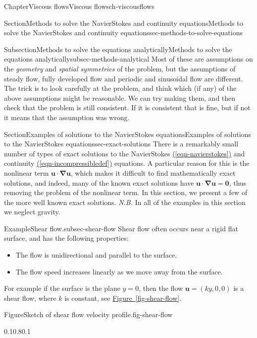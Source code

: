 \documentclass[oneside,10pt,]{book}
\newcommand{\xreffont}{\relax}
\newcommand{\ptxlistdisc}{\raisebox{0.3ex}{\textbullet}}
\numberwithin{equation}{section}
\newcommand{\bu}{\boldsymbol{u}}
\newcommand{\bzero}{\boldsymbol{0}}
\newcommand{\bnabla}{\boldsymbol{\nabla}}
\begin{document}
\begin{chapterptx}{Chapter}{Viscous flows}{}{Viscous flows}{}{}{ch-viscousflows}
\begin{sectionptx}{Section}{Methods to solve the Navier\textendash{}Stokes and continuity equations}{}{Methods to solve the Navier\textendash{}Stokes and continuity equations}{}{}{sec-methods-to-solve-equations}
\begin{subsectionptx}{Subsection}{Methods to solve the equations analytically}{}{Methods to solve the equations analytically}{}{}{subsec-methods-analytical}
Most of these are assumptions on the \emph{geometry} and \emph{spatial symmetries} of the problem, but the assumptions of steady flow, fully developed flow and periodic and sinusoidal flow are different. The trick is to look carefully at the problem, and think which (if any) of the above assumptions might be reasonable. We can try making them, and then check that the problem is still consistent. If it is consistent that is fine, but if not it means that the assumption was wrong.%
\end{subsectionptx}
\end{sectionptx}
%
%
\typeout{************************************************}
\typeout{************************************************}
%
\begin{sectionptx}{Section}{Examples of solutions to the Navier\textendash{}Stokes equations}{}{Examples of solutions to the Navier\textendash{}Stokes equations}{}{}{sec-exact-solutions}
There is a remarkably small number of types of exact solutions to the Navier\textendash{}Stokes \hyperref[eqn-navierstokes]{({\xreffont\ref{eqn-navierstokes}})} and continuity \hyperref[eqn-incompressibledef]{({\xreffont\ref{eqn-incompressibledef}})} equations. A particular reason for this is the nonlinear term \(\bu\cdot\bnabla\bu\), which makes it difficult to find mathematically exact solutions, and indeed, many of the known exact solutions have \(\bu\cdot\bnabla\bu=\bzero\), thus removing the problem of the nonlinear term. In this section, we present a few of the more well known exact solutions. \emph{N.B.} In all of the examples in this section we neglect gravity.%
\begin{example}{Example}{Shear flow.}{subsec-shear-flow}%
Shear flow often occurs near a rigid flat surface, and has the following properties:%
\begin{itemize}[label=\ptxlistdisc]
\item{}The flow is unidirectional and parallel to the surface.%
\item{}The flow speed increases linearly as we move away from the surface.%
\end{itemize}
For example if the surface is the plane \(y=0\), then the flow \(\bu=(ky,0,0)\) is a shear flow, where \(k\) is constant, see \hyperref[fig-shear-flow]{Figure~{\xreffont\ref{fig-shear-flow}}}.%
\begin{figureptx}{Figure}{Sketch of shear flow velocity profile.}{fig-shear-flow}{}%
\begin{image}{0.1}{0.8}{0.1}{}%

\end{image}
\end{figureptx}
\end{example}
\end{sectionptx}
\end{chapterptx}
\end{document}
